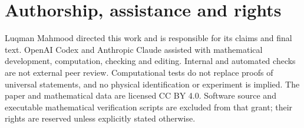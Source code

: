 \section*{Authorship, assistance and rights}
Luqman Mahmood directed this work and is responsible for its claims and final
text. OpenAI Codex and Anthropic Claude assisted with mathematical development,
computation, checking and editing. Internal and automated checks are not
external peer review. Computational tests do not replace proofs of universal
statements, and no physical identification or experiment is implied.
The paper and mathematical data are licensed CC BY 4.0. Software source and
executable mathematical verification scripts are excluded from that grant;
their rights are reserved unless explicitly stated otherwise.
